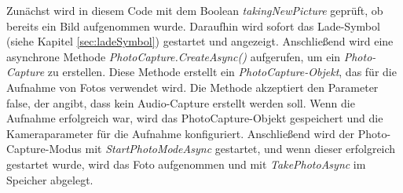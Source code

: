 Zunächst wird in diesem Code mit dem Boolean \textit{takingNewPicture} geprüft, ob bereits ein Bild aufgenommen wurde. Daraufhin wird sofort das Lade-Symbol (siehe Kapitel \ref{sec:ladeSymbol}) gestartet und angezeigt. Anschließend wird eine asynchrone Methode \textit{PhotoCapture.CreateAsync()} aufgerufen, um ein \textit{Photo-Capture} zu erstellen. Diese Methode erstellt ein \textit{PhotoCapture-Objekt}, das für die Aufnahme von Fotos verwendet wird. Die Methode akzeptiert den Parameter false, der angibt, dass kein Audio-Capture erstellt werden soll. Wenn die Aufnahme erfolgreich war, wird das PhotoCapture-Objekt gespeichert und die Kameraparameter für die Aufnahme konfiguriert. Anschließend wird der Photo-Capture-Modus mit \textit{StartPhotoModeAsync} gestartet, und wenn dieser erfolgreich gestartet wurde, wird das Foto aufgenommen und mit \textit{TakePhotoAsync} im Speicher abgelegt.

